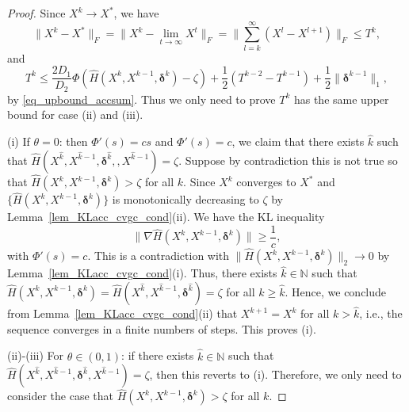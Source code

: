 \documentclass[twoside,11pt]{article}
\numberwithin{equation}{section}
\begin{document}
 \begin{proof} 
 Since $X^{k}\to X^{*} $, we have 
 \begin{equation}
   \|X^{k}-X^{*}\|_{F} = \|X^{k}-\lim\limits_{t\to\infty}X^{t}\|_{F} = \|\sum\limits_{l=k}^{\infty} (X^{l}-X^{l+1})\|_{F}\le T^{k},
   \end{equation}
 and 
 \begin{equation}\label{eqKLacc_Rrbound}
   T^{k}\le \frac{2D_{1}}{D_{2}} \Phi \left(\hat{H} (X^{k},X^{k-1},\bm{\delta}^{k})-\zeta\right)
   +\frac{1}{2} (T^{k-2}-T^{k-1}) +\frac{1}{2}\|\bm{\delta}^{k-1}\|_{1},
 \end{equation}
 by \eqref{eq_upbound_accsum}. 
 Thus we only need to prove $T^{k} $ has the same upper bound for case  (ii) and  (iii). 
 
 
 (i) 
   If $\theta=0 $: then $\Phi{'} (s)=cs$ and  $\Phi{'} (s)=c$, we claim that there exists $\hat{k}$ such that $\hat{H} (X^{\hat{k}},X^{\hat{k}-1},\bm{\delta}^{\hat{k}},,X^{\hat{k}-1}) =\zeta $.  Suppose by contradiction this is not true so that $\hat{H} (X^{k},X^{k-1},\bm{\delta}^{k}) > \zeta$ for all $k$.
   Since $X^{k} $ converges to $X^{*} $ and $\{\hat{H} (X^{k},X^{k-1},\bm{\delta}^{k})\}$ is monotonically decreasing to $\zeta $ by Lemma~\ref{lem_KLacc_cvgc_cond}(ii). We have the KL inequality 
     \begin{equation}
       \| \nabla \hat{H} (X^{k},X^{k-1},\bm{\delta}^{k})\| \ge \frac{1}{c},
     \end{equation}   
   with $\Phi{'} (s)=c $.
   This is a contradiction with $\|\hat{H} (X^{k},X^{k-1},\bm{\delta}^{k})\|_{2}\to 0 $ by Lemma~\ref{lem_KLacc_cvgc_cond}(i).
   Thus, there exists $\hat{k}\in\mathbb{N} $ such that $\hat{H} (X^{k},X^{k-1},\bm{\delta}^{k})=\hat{H} (X^{\hat{k}},X^{\hat{k}-1},\bm{\delta}^{\hat{k}} ) =\zeta $ for all $k\ge \hat{k} $. Hence, we conclude from Lemma~\ref{lem_KLacc_cvgc_cond}(ii) that $X^{k+1}=X^{k} $ for all $k>\hat{k} $, {i.e.}, the sequence converges in a finite numbers of steps. This proves  (i). 
 
 (ii)-(iii) For $\theta\in (0,1) $: 
 if there exists $\hat{k}\in\mathbb{N} $ such that $ \hat{H} (X^{\hat{k}},X^{\hat{k}-1},\bm{\delta}^{\hat{k}},X^{\hat{k}-1}) =\zeta $, then this reverts to (i).  Therefore,  we only need to consider the case that $\hat{H} (X^{k},X^{k-1},\bm{\delta}^{k})>\zeta $ for all $k $.  
 

\end{proof}
\end{document}
